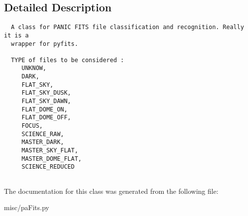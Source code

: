 \subsection{Detailed Description}


\footnotesize\begin{verbatim}
  A class for PANIC FITS file classification and recognition. Really it is a
  wrapper for pyfits.

  TYPE of files to be considered :
     UNKNOW,
     DARK,
     FLAT_SKY,
     FLAT_SKY_DUSK,
     FLAT_SKY_DAWN,
     FLAT_DOME_ON,
     FLAT_DOME_OFF,
     FOCUS,
     SCIENCE_RAW,
     MASTER_DARK,
     MASTER_SKY_FLAT,
     MASTER_DOME_FLAT,
     SCIENCE_REDUCED
     
\end{verbatim}
\normalsize
 



The documentation for this class was generated from the following file:\begin{CompactItemize}
\item 
misc/pa\-Fits.py\end{CompactItemize}
